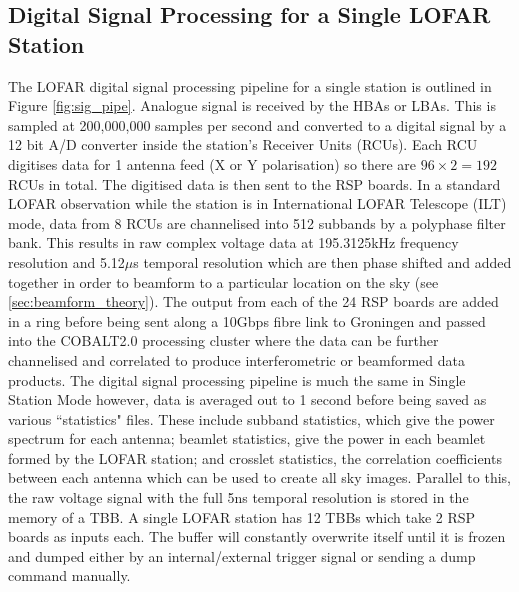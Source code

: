 \subsection{Digital Signal Processing for a Single LOFAR Station}
\label{sec:sig_pipe}
The LOFAR digital signal processing pipeline for a single station is outlined in Figure \ref{fig:sig_pipe}. Analogue signal is received by the HBAs or LBAs. This is sampled at 200,000,000 samples per second and converted to a digital signal by a 12 bit A/D converter inside the station's Receiver Units (RCUs). Each RCU digitises data for 1 antenna feed (X or Y polarisation) so there are $96 \times 2 = 192$ RCUs in total. The digitised data is then sent to the RSP boards. In a standard LOFAR observation while the station is in International LOFAR Telescope (ILT) mode, data from 8 RCUs are channelised into 512 subbands by a polyphase filter bank. This results in raw complex voltage data at 195.3125kHz frequency resolution and 5.12$\mu$s temporal resolution which are then phase shifted and added together in order to beamform to a particular location on the sky (see \ref{sec:beamform_theory}). The output from each of the 24 RSP boards are added in a ring before being sent along a 10Gbps fibre link to Groningen and passed into the COBALT2.0 processing cluster where the data can be further channelised and correlated to produce interferometric or beamformed data products.
The digital signal processing pipeline is much the same in Single Station Mode however, data is averaged out to 1 second before being saved as various ``statistics" files. These include subband statistics, which give the power spectrum for each antenna; beamlet statistics, give the power in each beamlet formed by the LOFAR station; and crosslet statistics, the correlation coefficients between each antenna which can be used to create all sky images.
Parallel to this, the raw voltage signal with the full 5ns temporal resolution is stored in the memory of a TBB. A single LOFAR station has 12 TBBs which take 2 RSP boards as inputs each. The buffer will constantly overwrite itself until it is frozen and dumped either by an internal/external trigger signal or sending a dump command manually.

